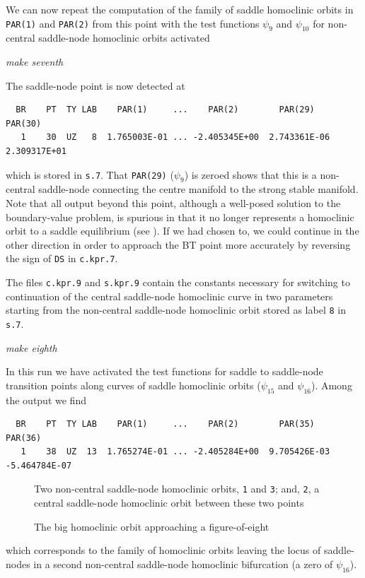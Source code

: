 \documentclass[12pt]{report}
\begin{document}
We can now repeat the computation of the family of saddle homoclinic
orbits in {\tt PAR(1)} and {\tt PAR(2)} from this point with
the test functions $\psi_9$ and $\psi_{10}$ for non-central
saddle-node homoclinic orbits activated 
\begin{center}
{\it make seventh}
\end{center}
The saddle-node point is now detected at 
\begin{verbatim} 
  BR    PT  TY LAB    PAR(1)     ...    PAR(2)        PAR(29)       PAR(30)
   1    30  UZ   8  1.765003E-01 ... -2.405345E+00  2.743361E-06  2.309317E+01
\end{verbatim}
which is stored in {\tt s.7}.
That {\tt PAR(29)} ($\psi_9$) is zeroed shows that this
is a non-central saddle-node connecting the centre manifold to the strong stable
manifold. Note that all output beyond this point, although a well-posed
solution to the boundary-value problem, is spurious in that it no longer
represents a homoclinic orbit to a saddle equilibrium (see
). If we had chosen
to, we could continue in the other direction in order to
approach the BT point more accurately by reversing the sign of
{\tt DS} in {\tt c.kpr.7}.
 
The files {\tt c.kpr.9} and {\tt s.kpr.9} contain the constants necessary 
for switching to continuation of the central saddle-node homoclinic curve 
in two parameters starting from the non-central saddle-node homoclinic orbit
stored as label {\tt 8} in {\tt s.7}.
\begin{center}
{\it make eighth}
\end{center}
In this run we have activated the test functions for saddle to saddle-node
transition points along curves of saddle homoclinic orbits ($\psi_{15}$ and 
$\psi_{16}$). Among the output we find
\begin{verbatim}
  BR    PT  TY LAB    PAR(1)     ...    PAR(2)        PAR(35)       PAR(36)    
   1    38  UZ  13  1.765274E-01 ... -2.405284E+00  9.705426E-03 -5.464784E-07
\end{verbatim}
\begin{figure}[p]
\epsfysize 9.0cm
\centerline{}
\caption{Two non-central saddle-node homoclinic orbits, {\tt 1} and {\tt 3};
and, {\tt 2}, a central saddle-node homoclinic orbit between
these two points \label{kf.7}}
\end{figure}
\begin{figure}[p]
\epsfysize 9.0cm
\centerline{}
\caption{The big homoclinic orbit approaching a figure-of-eight}
\label{kp.8}
\end{figure}
%
which corresponds to the family of homoclinic orbits leaving
the locus of saddle-nodes in a second non-central saddle-node
homoclinic bifurcation (a zero of $\psi_{16}$). 
\end{document}
